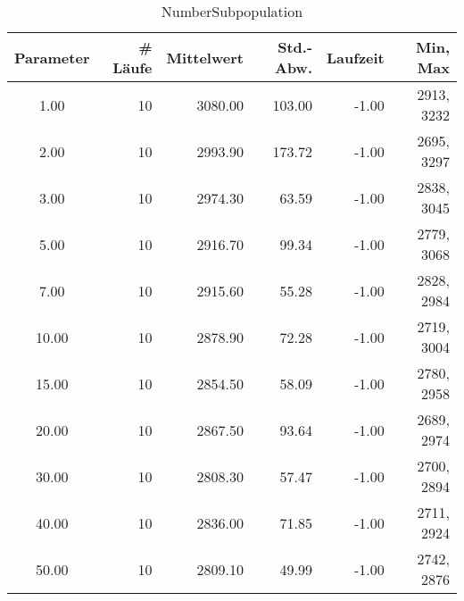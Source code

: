 \begin{table}[tbp]
\begin{tabular}{ | c || r | r | r | r | r | }
\hline
Parameter & \# Läufe & Mittelwert & Std.-Abw. & Laufzeit & Min, Max \\
\hline
   1.00 &  10 & 3080.00 &  103.00 &   -1.00 & 2913, 3232 \\
   2.00 &  10 & 2993.90 &  173.72 &   -1.00 & 2695, 3297 \\
   3.00 &  10 & 2974.30 &   63.59 &   -1.00 & 2838, 3045 \\
   5.00 &  10 & 2916.70 &   99.34 &   -1.00 & 2779, 3068 \\
   7.00 &  10 & 2915.60 &   55.28 &   -1.00 & 2828, 2984 \\
  10.00 &  10 & 2878.90 &   72.28 &   -1.00 & 2719, 3004 \\
  15.00 &  10 & 2854.50 &   58.09 &   -1.00 & 2780, 2958 \\
  20.00 &  10 & 2867.50 &   93.64 &   -1.00 & 2689, 2974 \\
  30.00 &  10 & 2808.30 &   57.47 &   -1.00 & 2700, 2894 \\
  40.00 &  10 & 2836.00 &   71.85 &   -1.00 & 2711, 2924 \\
  50.00 &  10 & 2809.10 &   49.99 &   -1.00 & 2742, 2876 \\
\hline
\end{tabular}
\caption{NumberSubpopulation}
\end{table}


